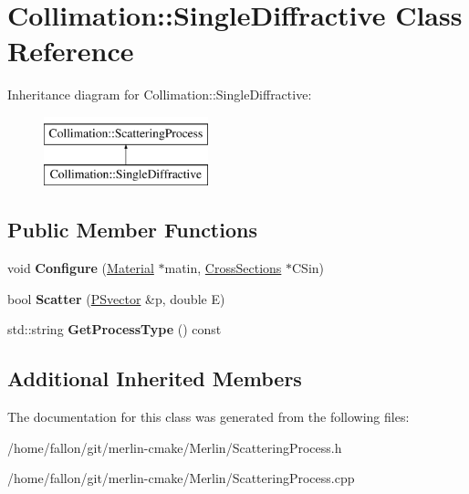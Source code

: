 \hypertarget{classCollimation_1_1SingleDiffractive}{}\section{Collimation\+:\+:Single\+Diffractive Class Reference}
\label{classCollimation_1_1SingleDiffractive}
Inheritance diagram for Collimation\+:\+:Single\+Diffractive\+:\begin{figure}[H]
\begin{center}
\leavevmode
\includegraphics[height=2.000000cm]{classCollimation_1_1SingleDiffractive}
\end{center}
\end{figure}
\subsection*{Public Member Functions}
\begin{DoxyCompactItemize}
\item 
\mbox{\label{classCollimation_1_1SingleDiffractive_a05184488f8f2c7f9ba6a0e5b3f2a1b57}} 
void {\bfseries Configure} (\hyperlink{classMaterial}{Material} $\ast$matin, \hyperlink{classCollimation_1_1CrossSections}{Cross\+Sections} $\ast$C\+Sin)
\item 
\mbox{\label{classCollimation_1_1SingleDiffractive_a10c6428eb84c0e1455a684428661f451}} 
bool {\bfseries Scatter} (\hyperlink{classPSvector}{P\+Svector} \&p, double E)
\item 
\mbox{\label{classCollimation_1_1SingleDiffractive_ad0a0da7034b8527b87dc50278029680c}} 
std\+::string {\bfseries Get\+Process\+Type} () const
\end{DoxyCompactItemize}
\subsection*{Additional Inherited Members}


The documentation for this class was generated from the following files\+:\begin{DoxyCompactItemize}
\item 
/home/fallon/git/merlin-\/cmake/\+Merlin/Scattering\+Process.\+h\item 
/home/fallon/git/merlin-\/cmake/\+Merlin/Scattering\+Process.\+cpp\end{DoxyCompactItemize}
